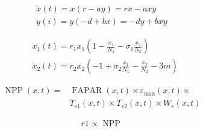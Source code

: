 $$
\begin{array}{r}
	\dot{x}(t)=x(r-a y)=r x-a x y \\
	\dot{y}(i)=y(-d+b x)=-d y+b x y
\end{array}
$$



$$
\begin{aligned}
	& \dot{x}_1(t)=r_1 x_1\left(1-\frac{x_1}{N_1}-\sigma_1 \frac{x_2}{N_2}\right) \\
	& \dot{x}_2(t)=r_2 x_2\left(-1+\sigma_2 \frac{x_1}{N_1}-\frac{x_2}{N_2}-3m\right)
\end{aligned}
$$


$$
\begin{aligned}
	\operatorname{NPP}(x, t)= & \operatorname{FAPAR}(x, t) \times \varepsilon_{\max }(x, t) \times \\
	& T_{\varepsilon 1}(x, t) \times T_{\varepsilon 2}(x, t) \times W_{\varepsilon}(x, t)
\end{aligned}
$$

$$
\begin{aligned}
r1\propto\operatorname{NPP}
\end{aligned}
$$
